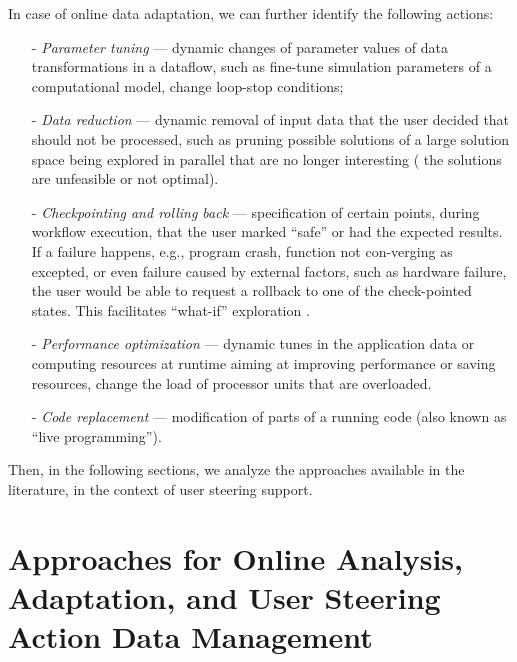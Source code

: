 In case of online data adaptation, we can further identify the following actions:

 \begin{itemize}
\setlength\itemsep{-2mm}

    \item[-] \textit{Parameter tuning} --- dynamic changes of parameter values of data transformations in a dataflow, such as fine-tune simulation parameters of a computational model,
    change loop-stop conditions;

    \item[-] \textit{Data reduction} --- dynamic removal of input data that the user decided that should not be processed, such as pruning possible solutions of a large solution space being explored in parallel that are no longer
interesting (\eg{} the solutions are unfeasible or not optimal).

    \item[-] \textit{Checkpointing and rolling back} --- specification of certain points, during workflow execution, that the user marked ``safe'' or had the expected results. If a failure happens, e.g., program crash, function not con-verging as excepted, or even failure caused by external factors, such as hardware failure, the user would be able to request a rollback to one of the check-pointed states. This facilitates ``what-if'' exploration
    \cite{Bourhis2016Analyzing}.

    \item[-] \textit{Performance optimization} --- dynamic tunes in the application data or computing resources at runtime aiming at improving performance or saving resources, \eg{} change the load of
    processor units that are overloaded.

    \item[-] \textit{Code replacement}  --- modification of parts of a running code (also
known as ``live programming'').


 \end{itemize}

 Then, in the following sections, we analyze the approaches available in the literature, in the context of user steering support.




\section{Approaches for Online Analysis, Adaptation, and User Steering Action Data Management}

